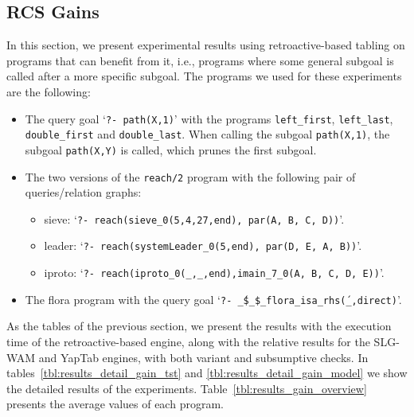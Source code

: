 


\subsection{RCS Gains}

In this section, we present experimental results using retroactive-based tabling on programs that
can benefit from it, i.e., programs where some general subgoal is called after a more specific subgoal.
The programs we used for these experiments are the following:

\begin{itemize}
   \item The query goal `\texttt{?-~path(X,1)}' with the programs \texttt{left\_first}, \texttt{left\_last},
   \texttt{double\_first} and \texttt{double\_last}. When calling the subgoal \texttt{path(X,1)}, the subgoal
   \texttt{path(X,Y)} is called, which prunes the first subgoal.
   
   \item The two versions of the \texttt{reach/2} program with the following pair of queries/relation graphs:

   \begin{itemize}
      \item sieve: `\texttt{?-~reach(sieve\_0(5,4,27,end),~par(A,~B,~C,~D))}'.
      \item leader: `\texttt{?-~reach(systemLeader\_0(5,end),~par(D,~E,~A,~B))}'.
      \item iproto: `\texttt{?-~reach(iproto\_0(\_,\_,end),imain\_7\_0(A,~B,~C,~D,~E))}'.
   \end{itemize}
   
   \item The flora program with the query goal `\texttt{?-~\'\_\$\_\$\_flora\_isa\_rhs\'(\_,direct)}'.
\end{itemize}

As the tables of the previous section, we present the results with the execution time of the retroactive-based
engine, along with the relative results for the SLG-WAM and YapTab engines, with both variant and subsumptive checks.
In tables~\ref{tbl:results_detail_gain_tst} and \ref{tbl:results_detail_gain_model} we show the detailed
results of the experiments. Table~\ref{tbl:results_gain_overview} presents the average values of each program.

